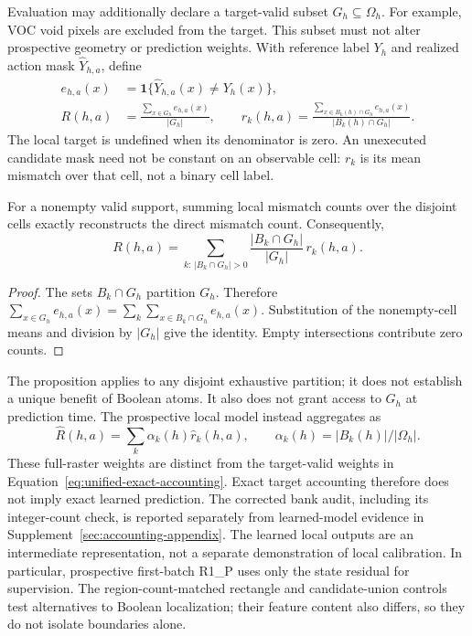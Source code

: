 Evaluation may additionally declare a target-valid subset
$G_h\subseteq\Omega_h$. For example, VOC void pixels are excluded from the
target. This subset must not alter prospective geometry or prediction
weights. With reference label $Y_h$ and realized action mask
$\widehat Y_{h,a}$, define
\begin{align}
 e_{h,a}(x)&=\mathbf 1\{\widehat Y_{h,a}(x)\ne Y_h(x)\},\nonumber\\
 R(h,a)&=\frac{\sum_{x\in G_h} e_{h,a}(x)}{|G_h|},\qquad
 r_k(h,a)=\frac{\sum_{x\in B_k(h)\cap G_h}e_{h,a}(x)}{|B_k(h)\cap G_h|}.
 \label{eq:unified-targets}
\end{align}
The local target is undefined when its denominator is zero. An unexecuted
candidate mask need not be constant on an observable cell: $r_k$ is its
mean mismatch over that cell, not a binary cell label.

\begin{proposition}
\label{prop:unified-accounting}
For a nonempty valid support, summing local mismatch counts over the disjoint
cells exactly reconstructs the direct mismatch count. Consequently,
\begin{equation}
 R(h,a)=\sum_{k:\,|B_k\cap G_h|>0}
       \frac{|B_k\cap G_h|}{|G_h|}\,r_k(h,a).
 \label{eq:unified-exact-accounting}
\end{equation}
\end{proposition}
\begin{proof}
The sets $B_k\cap G_h$ partition $G_h$. Therefore
$\sum_{x\in G_h}e_{h,a}(x)=\sum_k\sum_{x\in B_k\cap G_h}e_{h,a}(x)$.
Substitution of the nonempty-cell means and division by $|G_h|$ give the
identity. Empty intersections contribute zero counts.
\end{proof}

The proposition applies to any disjoint exhaustive partition; it does not
establish a unique benefit of Boolean atoms. It also does not grant access to
$G_h$ at prediction time. The prospective local model instead aggregates as
\begin{equation}
 \widehat R(h,a)=\sum_k\alpha_k(h)\widehat r_k(h,a),\qquad
 \alpha_k(h)=|B_k(h)|/|\Omega_h|.
 \label{eq:unified-prospective-aggregation}
\end{equation}
These full-raster weights are distinct from the target-valid weights in
Equation~\ref{eq:unified-exact-accounting}. Exact target accounting therefore
does not imply exact learned prediction. The corrected bank audit, including
its integer-count check, is reported separately from learned-model evidence
in Supplement~\ref{sec:accounting-appendix}.
The learned local outputs are an intermediate representation, not a separate
demonstration of local calibration. In particular, prospective first-batch R1\_P uses only
the state residual for supervision. The region-count-matched rectangle and
candidate-union controls test alternatives to Boolean localization; their
feature content also differs, so they do not isolate boundaries alone.

